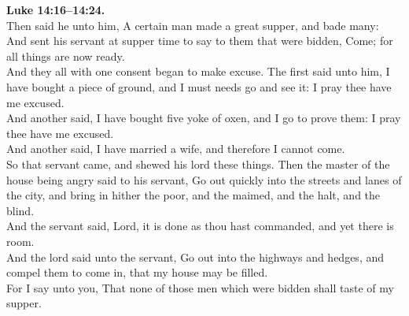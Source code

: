 \documentclass[10pt]{article} %
\begin{document}
{\begin{minipage}[t]{0.45\textwidth}
\textbf{Luke 14:16--14:24.}\\
Then said he unto him, A certain man made a great supper, and bade many:\\
And sent his servant at supper time to say to them that were bidden, Come; for all things are now ready.\\
And they all with one consent began to make excuse. The first said unto him, I have bought a piece of ground, and I must needs go and see it: I pray thee have me excused.\\
And another said, I have bought five yoke of oxen, and I go to prove them: I pray thee have me excused.\\
And another said, I have married a wife, and therefore I cannot come.\\
So that servant came, and shewed his lord these things. Then the master of the house being angry said to his servant, Go out quickly into the streets and lanes of the city, and bring in hither the poor, and the maimed, and the halt, and the blind.\\
And the servant said, Lord, it is done as thou hast commanded, and yet there is room.\\
And the lord said unto the servant, Go out into the highways and hedges, and compel them to come in, that my house may be filled.\\
For I say unto you, That none of those men which were bidden shall taste of my supper.\\

\end{minipage}}
\vspace*{\fill}
\newpage
\huge%
\vspace*{\fill}
\begin{spacing}{1.0}
\end{spacing}
\vspace*{\fill}
\end{document}
